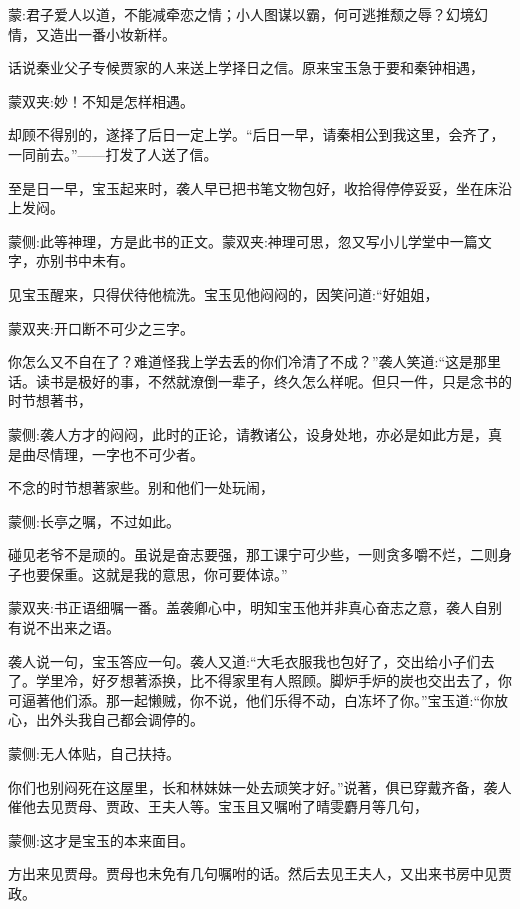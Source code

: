 
\begin{parag}
    \begin{note}蒙:君子爱人以道，不能减牵恋之情；小人图谋以霸，何可逃推颓之辱？幻境幻情，又造出一番小妆新样。\end{note}
\end{parag}


\begin{parag}
    话说秦业父子专候贾家的人来送上学择日之信。原来宝玉急于要和秦钟相遇，\begin{note}蒙双夹:妙！不知是怎样相遇。\end{note}却顾不得别的，遂择了后日一定上学。“后日一早，请秦相公到我这里，会齐了，一同前去。”——打发了人送了信。
\end{parag}


\begin{parag}
    至是日一早，宝玉起来时，袭人早已把书笔文物包好，收拾得停停妥妥，坐在床沿上发闷。\begin{note}蒙侧:此等神理，方是此书的正文。蒙双夹:神理可思，忽又写小儿学堂中一篇文字，亦别书中未有。\end{note}见宝玉醒来，只得伏待他梳洗。宝玉见他闷闷的，因笑问道:“好姐姐，\begin{note}蒙双夹:开口断不可少之三字。\end{note}你怎么又不自在了？难道怪我上学去丢的你们冷清了不成？”袭人笑道:“这是那里话。读书是极好的事，不然就潦倒一辈子，终久怎么样呢。但只一件，只是念书的时节想著书，\begin{note}蒙侧:袭人方才的闷闷，此时的正论，请教诸公，设身处地，亦必是如此方是，真是曲尽情理，一字也不可少者。\end{note}不念的时节想著家些。别和他们一处玩闹，\begin{note}蒙侧:长亭之嘱，不过如此。\end{note}碰见老爷不是顽的。虽说是奋志要强，那工课宁可少些，一则贪多嚼不烂，二则身子也要保重。这就是我的意思，你可要体谅。”\begin{note}蒙双夹:书正语细嘱一番。盖袭卿心中，明知宝玉他并非真心奋志之意，袭人自别有说不出来之语。\end{note}袭人说一句，宝玉答应一句。袭人又道:“大毛衣服我也包好了，交出给小子们去了。学里冷，好歹想著添换，比不得家里有人照顾。脚炉手炉的炭也交出去了，你可逼著他们添。那一起懒贼，你不说，他们乐得不动，白冻坏了你。”宝玉道:“你放心，出外头我自己都会调停的。\begin{note}蒙侧:无人体贴，自己扶持。\end{note}你们也别闷死在这屋里，长和林妹妹一处去顽笑才好。”说著，俱已穿戴齐备，袭人催他去见贾母、贾政、王夫人等。宝玉且又嘱咐了晴雯麝月等几句，\begin{note}蒙侧:这才是宝玉的本来面目。\end{note}方出来见贾母。贾母也未免有几句嘱咐的话。然后去见王夫人，又出来书房中见贾政。
\end{parag}



